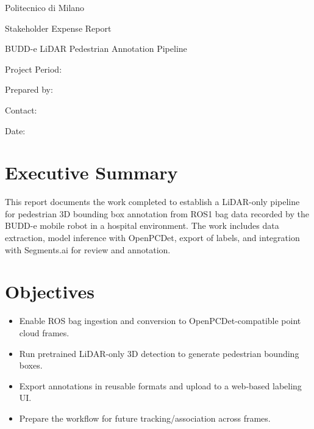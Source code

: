 \documentclass[11pt,a4paper]{report}
\begin{document}
\begin{titlepage}
    \centering
    \vspace*{1.5cm}
    {\LARGE Politecnico di Milano\par}
    \vspace{0.5cm}
    {\Large Stakeholder Expense Report\par}
    \vspace{1.5cm}
    {\huge BUDD-e LiDAR Pedestrian Annotation Pipeline\par}
    \vspace{1.0cm}
    {\large Project Period: \underline{\hspace{5cm}}\par}
    \vspace{0.5cm}
    {\large Prepared by: \underline{\hspace{7cm}}\par}
    \vspace{0.5cm}
    {\large Contact: \underline{\hspace{8cm}}\par}
    \vfill
    {\large Date: \underline{\hspace{5cm}}\par}
\end{titlepage}

\tableofcontents
\clearpage

\chapter{Executive Summary}
This report documents the work completed to establish a LiDAR-only pipeline for pedestrian 3D bounding box annotation from ROS1 bag data recorded by the BUDD-e mobile robot in a hospital environment. The work includes data extraction, model inference with OpenPCDet, export of labels, and integration with Segments.ai for review and annotation.

\chapter{Objectives}
\begin{itemize}[leftmargin=2em]
    \item Enable ROS bag ingestion and conversion to OpenPCDet-compatible point cloud frames.
    \item Run pretrained LiDAR-only 3D detection to generate pedestrian bounding boxes.
    \item Export annotations in reusable formats and upload to a web-based labeling UI.
    \item Prepare the workflow for future tracking/association across frames.
\end{itemize}
\end{document}
